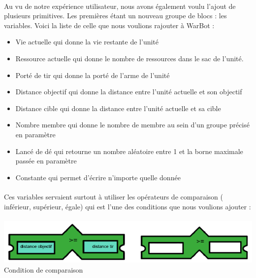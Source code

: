 \documentclass{report}
\begin{document}
\paragraph{}

  Au vu de notre expérience utilisateur, nous avons également voulu l’ajout de plusieurs primitives. Les premières étant un nouveau groupe de blocs : les variables. Voici la liste de celle que nous voulions rajouter à WarBot :
  \begin{itemize}
\item Vie actuelle qui donne la vie restante de l’unité
\item Ressource actuelle qui donne le nombre de ressources dans le sac de l’unité.
\item Porté de tir qui donne la porté de l’arme de l’unité
\item Distance objectif qui donne la distance entre l’unité actuelle et son objectif
\item Distance cible qui donne la distance entre l’unité actuelle et sa cible
\item Nombre membre qui donne le nombre de membre au sein d’un groupe précisé en paramètre
\item Lancé de dé qui retourne un nombre aléatoire entre 1 et la borne maximale passée en paramètre
\item Constante qui permet d’écrire n’importe quelle donnée
\end{itemize}
\paragraph{}
  Ces variables servaient surtout à utiliser les opérateurs de comparaison ( inférieur, supérieur, égale) qui est l’une des conditions que nous voulions ajouter : 

\paragraph{}
\begin{adjustwidth}{-6em}{}
\includegraphics[scale=1]{DATA/comparaison.png}
 {Condition de comparaison}
\end{adjustwidth}
\paragraph{}
\end{document}
